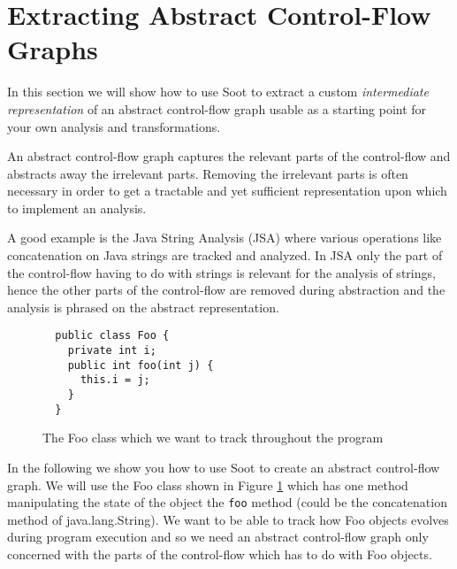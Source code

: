 \documentclass{article}
\newcommand{\code}[1]{\texttt{\small #1}}
\begin{document}
\section{Extracting Abstract Control-Flow Graphs}

In this section we will show how to use Soot to extract a custom
\emph{intermediate representation} of an abstract control-flow graph
usable as a starting point for your own analysis and transformations.

An abstract control-flow graph captures the relevant parts of the
control-flow and abstracts away the irrelevant parts. Removing the
irrelevant parts is often necessary in order to get a tractable and
yet sufficient representation upon which to implement an analysis.

A good example is the Java String Analysis (JSA)\cite{strings2003}
where various operations like concatenation on Java strings are
tracked and analyzed. In JSA only the part of the control-flow having
to do with strings is relevant for the analysis of strings, hence the
other parts of the control-flow are removed during abstraction and the
analysis is phrased on the abstract representation.

\begin{figure}[htb]
  \centering
  \begin{verbatim}
  public class Foo {
    private int i;
    public int foo(int j) {
      this.i = j;
    }
  }
  \end{verbatim}
  \caption{The Foo class which we want to track throughout the program}
  \label{fig:foo:class}
\end{figure}

In the following we show you how to use Soot to create an abstract
control-flow graph. We will use the Foo class shown in Figure
\ref{fig:foo:class} which has one method manipulating the state of the
object the \code{foo} method (could be the concatenation method of
java.lang.String). We want to be able to track how Foo objects evolves
during program execution and so we need an abstract control-flow graph
only concerned with the parts of the control-flow which has to do with
Foo objects.
\end{document}
